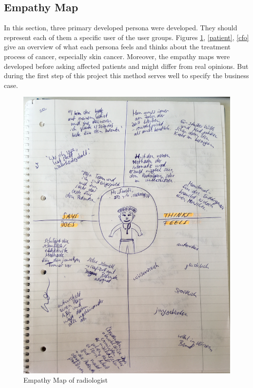 \subsection{Empathy Map}

In this section, three primary developed persona were developed. They should represent each of them a specific user of the user groups. Figures \ref{radiologist}, \ref{patient}, \ref{cfo} give an overview of what each persona feels and thinks about the treatment process of cancer, especially skin cancer. Moreover, the empathy maps were developed before asking affected patients and might differ from real opinions. But during the first step of this project this method serves well to specify the business case. 

\begin{figure}[h!]
	\centering
	\includegraphics[width=1\textwidth]{images/empathymap_radiologist.jpg}
	\caption{Empathy Map of radiologist}
	\label{radiologist}
\end{figure}

